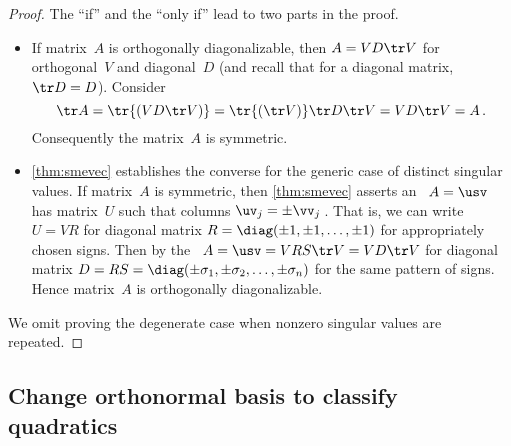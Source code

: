 \begin{proof} 
The ``if'' and the ``only if'' lead to two parts in the proof.
\begin{itemize}
\item If matrix~\(A\) is orthogonally diagonalizable, then \(A=VD\tr V\) for orthogonal~\(V\) and diagonal~\(D\) (and recall that for a diagonal matrix, \(\tr D=D\)).
Consider
\begin{equation*}
\tr A=\tr{(VD\tr V)}
=\tr{(\tr V)}\tr D\tr V
=VD\tr V=A\,.
\end{equation*}
Consequently the matrix~\(A\) is symmetric.

\item \autoref{thm:smevec} establishes the converse for the generic case of distinct singular values.
If matrix~\(A\) is symmetric, then \autoref{thm:smevec} asserts an \svd\ \(A=\usv\) has matrix~\(U\) such that columns \(\uv_j=\pm\vv_j\)\,.
That is, we can write \(U=VR\) for diagonal matrix \(R=\diag(\pm1,\pm1,\ldots,\pm1)\) for appropriately chosen signs.
Then by the \svd\ \(A=\usv=VRS\tr V=VD\tr V\) for diagonal matrix \(D=RS=\diag(\pm\sigma_1,\pm\sigma_2,\ldots,\pm\sigma_n)\) for the same pattern of signs.
Hence matrix~\(A\) is orthogonally diagonalizable.
\end{itemize}
We omit proving the degenerate case when nonzero singular values are repeated.
\end{proof}

\begin{comment}
Further material could include the following---maybe exercises.
For every \idx{symmetric matrix}, \(A^k=VD^k\tr V\).
Also, every \idx{square matrix} has a \idx{polar decomposition} \(A=RQ\) for symmetric positive semi-definite~\(R\) and orthogonal~\(Q\) (since \(A=\usv=(US\tr U)(U\tr V)\)) \pooliv{p.610}.  
\cite{Higham86} mentions applications to the Orthogonal Procrustes problem (perhaps in approx matrices), Aerospace, Optimization, Matrix square root, but these look too hard for this level.
\end{comment}









\subsection{Change orthonormal basis to classify quadratics}
\label{sec:cobcqs}

